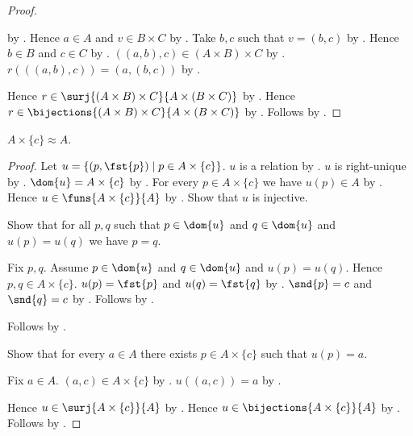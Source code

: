 \begin{proof}
\begin{subproof}
            by .
        Hence $a\in A$ and $v\in B\times C$ by .
        Take $b,c$ such that $v=(b,c)$
            by .
        Hence $b\in B$ and $c\in C$ by .
        $((a,b),c)\in(A\times B)\times C$
            by .
        $r(((a,b),c))=(a,(b,c))$
            by .
    \end{subproof}
    Hence $r\in\surj{(A\times B)\times C}{A\times(B\times C)}$
        by .
    Hence $r\in\bijections{(A\times B)\times C}{A\times(B\times C)}$
        by .
    Follows by .
\end{proof}

\begin{proposition}\label{times_singleton_right_equinum}
    $A\times\{c\}\approx A$.
\end{proposition}
\begin{proof}
    Let $u=\{(p,\fst{p})\mid p\in A\times\{c\}\}$.
    $u$ is a relation by .
    $u$ is right-unique by .
    $\dom{u}=A\times\{c\}$ by .
    For every $p\in A\times\{c\}$ we have $u(p)\in A$
        by .
    Hence $u\in\funs{A\times\{c\}}{A}$ by .
    Show that $u$ is injective.
    \begin{subproof}
        Show that for all $p,q$ such that $p\in\dom{u}$ and
            $q\in\dom{u}$ and $u(p)=u(q)$ we have $p=q$.
        \begin{subproof}
            Fix $p,q$.
            Assume $p\in\dom{u}$ and $q\in\dom{u}$ and $u(p)=u(q)$.
            Hence $p,q\in A\times\{c\}$.
            $u(p)=\fst{p}$ and $u(q)=\fst{q}$
                by .
            $\snd{p}=c$ and $\snd{q}=c$
                by .
            Follows by
                .
        \end{subproof}
        Follows by .
    \end{subproof}
    Show that for every $a\in A$ there exists $p\in A\times\{c\}$
        such that $u(p)=a$.
    \begin{subproof}
        Fix $a\in A$.
        $(a,c)\in A\times\{c\}$
            by .
        $u((a,c))=a$ by .
    \end{subproof}
    Hence $u\in\surj{A\times\{c\}}{A}$ by .
    Hence $u\in\bijections{A\times\{c\}}{A}$
        by .
    Follows by .
\end{proof}

